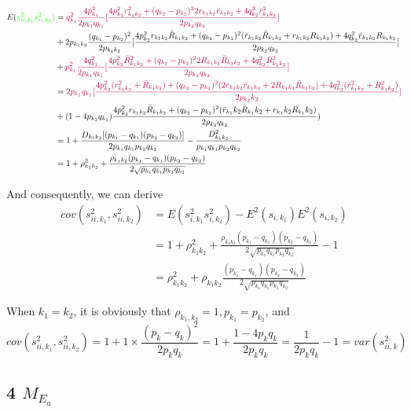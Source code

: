 \documentclass[]{article}
\begin{document}
\begin{align}
E(\color{green}{s_{ii,k_1}^2s_{ii,k_2}^2})&= \color{purple}{q^2_{k_1}\frac{4p_{k_1}^2}{2p_{k_1}q_{k_1}} [\frac{4p_{k_2}^2r^2_{k_1k_2}+(q_{k_2}-p_{k_2})^2 2r_{k_1k_2}\bar{r}_{k_1k_2} + 4q_{k_2}^2\bar{r}_{k_1k_2}^2}{2p_{k_2}q_{k_2}}]}\\
&+2p_{k_1k_2}\frac{(q_{k_1}-p_{k_2})^2}{2p_{k_1k_2}}[\frac{4p_{k_2}^2r_{k_1k_2}\bar{R}_{k_1k_2}+(q_{k_2}-p_{k_2})^2 (\bar{r}_{k_1k_2}\bar{R}_{k_1k_2}+r_{k_1k_2}R_{k_1k_2}) + 4q_{k_2}^2\bar{r}_{k_1k_2}R_{k_1k_2}}{2p_{k_2}q_{k_2}}]\\
&+\color{purple}{p^2_{k_1}\frac{4q_{k_1}^2}{2p_{k_1}q_{k_1}}[\frac{4p_{k_2}^2\bar{R}^2_{k_1k_2}+(q_{k_2}-p_{k_2})^2 2R_{k_1k_2}\bar{R}_{k_1k_2} + 4q_{k_2}^2R_{k_1k_2}^2}{2p_{k_2}q_{k_2}}]}\\
&=\color{purple}{2p_{k_1}q_{k_1}[\frac{4p^2_{k_2}(r^2_{k_1k_2}+\bar{R}_{k_1k_2})+(q_{k_2}-p_{k_2})^2(2r_{k_1k_2}\bar{r}_{k_1k_2}+2R_{k_1k_2}\bar{R}_{k_1k_2})+4q^2_{k_2}(\bar{r}^2_{k_1k_2}+R^2_{k_1k_2})}{2p_{k_2}{k_2}}]}\\
&+(1-4p_{k_1}q_{k_1})\frac{4p^2_{k_2}r_{k_1k_2}\bar{R}_{k_1k_2}+(q_{k_2}-p_{k_2})^2(\bar{r}_{k_1}{k_2}\bar{R}_{k_1}{k_2}+r_{k_1}{k_2}R_{k_1}{k_2})}{2p_{k_2}q_{k_2}})\\
&=1+\frac{D_{k_1k_2}[(p_{k_1}-q_{k_1})(p_{k_2}-q_{k_2})]}{2p_{k_1}q_{k_1}p_{k_2}q_{k_2}}-\frac{D^2_{k_1k_2}}{p_{k_1}q_{k_1}p_{k_2}q_{k_2}}\\
&=1+\rho^2_{k_1k_2}+\frac{\rho_{k_1k_2}(p_{k_1}-q_{k_1})(p_{k_2}-q_{k_2})}{2\sqrt{p_{k_1}q_{k_1}p_{k_2}q_{k_2}}}
\end{align}

And consequently, we can derive \begin{align}
cov(s_{ii,k_1}^2,s_{ii,k_2}^2)&=E(s_{i,k_1}^2s_{i,k_2}^2)-E^2(s_{i,k_1})E^2(s_{i,k_2})\\
&=1+\rho^2_{k_1k_2}+\frac{\rho_{k_1k_2}(p_{k_1}-q_{k_1})(p_{k_2}-q_{k_2})}{2\sqrt{p_{k_1}q_{k_1}p_{k_2}q_{k_2}}}-1\\
&=\rho^2_{k_1k_2}+\rho_{k_1k_2}\frac{(p_{k_1}-q_{k_1})(p_{k_2}-q_{k_2})}{2\sqrt{p_{k_1}q_{k_1}p_{k_2}q_{k_2}}}
\end{align}

When \(k_1 = k_2\), it is obviously that
\(\rho_{k_1,k_2}=1, p_{k_1}=p_{k_2}\), and
\[cov(s_{ii,k_1}^2,s_{ii,k_2}^2)=1+1\times\frac{(p_{k}-q_{k})^2}{2p_{k}q_{k}}=1+\frac{1-4p_{k}q_{k}}{2p_{k}q_{k}}=\frac{1}{2p_{k}q_{k}}-1=var(s_{ii,k}^2)\]

\hypertarget{m_e_a}{%
\subsection{\texorpdfstring{4 \(M_{E_a}\)}{4 M\_\{E\_a\}}}\label{m_e_a}}
\end{document}
